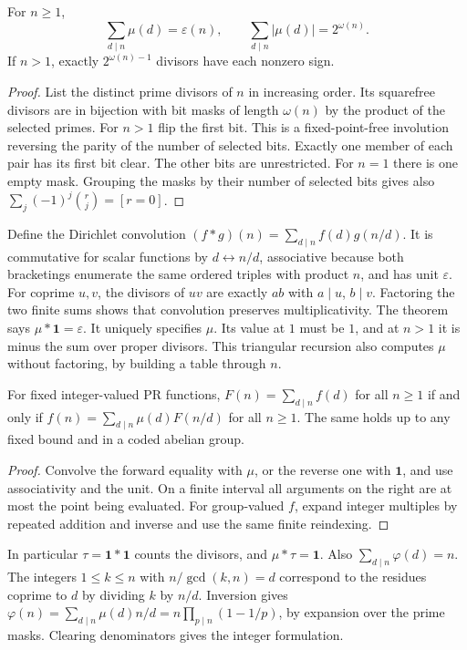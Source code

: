 \begin{theorem}
For $n\ge1$,
\[
 \sum_{d\mid n}\mu(d)=\varepsilon(n),\qquad
 \sum_{d\mid n}|\mu(d)|=2^{\omega(n)}.
\]
If $n>1$, exactly $2^{\omega(n)-1}$ divisors have each nonzero sign.
\end{theorem}
\begin{proof}
List the distinct prime divisors of $n$ in increasing order. Its squarefree
divisors are in bijection with bit masks of length $\omega(n)$ by the
product of the selected primes. For $n>1$ flip the first bit. This is
a fixed-point-free involution reversing the parity of the number of
selected bits. Exactly one member of each pair has its first bit clear.
The other bits are unrestricted. For $n=1$ there is one empty mask.
Grouping the masks by their number of selected bits gives also
$\sum_j(-1)^j\binom rj=[r=0]$.
\end{proof}

Define the Dirichlet convolution
$(f*g)(n)=\sum_{d\mid n}f(d)g(n/d)$. It is commutative for scalar functions by
$d\leftrightarrow n/d$, associative because both bracketings enumerate
the same ordered triples with product $n$, and has unit $\varepsilon$.
For coprime $u,v$, the divisors of $uv$ are exactly $ab$ with $a\mid u$,
$b\mid v$. Factoring the two finite sums shows that convolution preserves
multiplicativity. The theorem says $\mu*\mathbf1=\varepsilon$.
It uniquely specifies $\mu$. Its value at $1$ must be $1$, and at
$n>1$ it is minus the sum over proper divisors. This triangular recursion
also computes $\mu$ without factoring, by building a table through $n$.
\begin{theorem}
For fixed integer-valued PR functions, $F(n)=\sum_{d\mid n}f(d)$ for
all $n\ge1$ if and only if
$f(n)=\sum_{d\mid n}\mu(d)F(n/d)$ for all $n\ge1$.
The same holds up to any fixed bound and in a coded abelian group.
\end{theorem}
\begin{proof}
Convolve the forward equality with $\mu$, or the reverse one with
$\mathbf1$, and use associativity and the unit. On a finite interval
all arguments on the right are at most the point being evaluated.
For group-valued $f$, expand integer multiples by repeated addition
and inverse and use the same finite reindexing.
\end{proof}
In particular $\tau=\mathbf1*\mathbf1$ counts the divisors, and
$\mu*\tau=\mathbf1$. Also $\sum_{d\mid n}\varphi(d)=n$. The integers
$1\le k\le n$ with $n/\gcd(k,n)=d$ correspond to the residues coprime
to $d$ by dividing $k$ by $n/d$. Inversion gives
$\varphi(n)=\sum_{d\mid n}\mu(d)n/d
 =n\prod_{p\mid n}(1-1/p)$, by expansion over the prime masks.
Clearing denominators gives the integer formulation.

